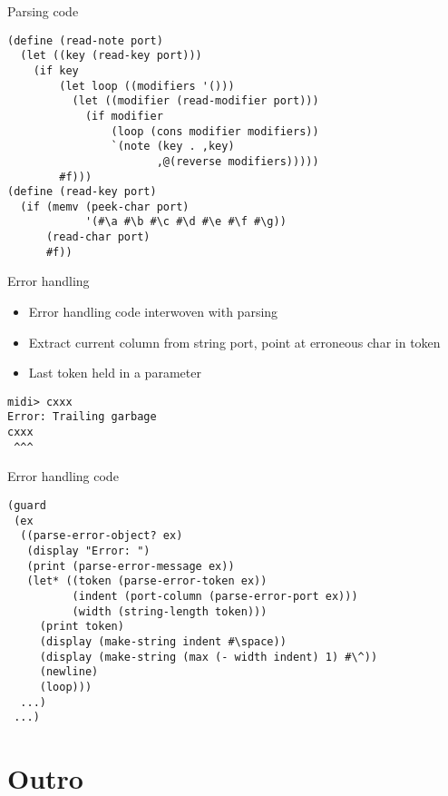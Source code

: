 \documentclass[presentation]{beamer}
\begin{document}
\begin{frame}[fragile,label=sec-3-12]{Parsing code}
 \begin{verbatim}
(define (read-note port)
  (let ((key (read-key port)))
    (if key
        (let loop ((modifiers '()))
          (let ((modifier (read-modifier port)))
            (if modifier
                (loop (cons modifier modifiers))
                `(note (key . ,key)
                       ,@(reverse modifiers)))))
        #f)))
(define (read-key port)
  (if (memv (peek-char port)
            '(#\a #\b #\c #\d #\e #\f #\g))
      (read-char port)
      #f))
\end{verbatim}
\end{frame}

\begin{frame}[fragile,label=sec-3-13]{Error handling}
 \begin{itemize}
\item Error handling code interwoven with parsing
\item Extract current column from string port, point at erroneous char in
token
\item Last token held in a parameter
\end{itemize}

\begin{verbatim}
midi> cxxx
Error: Trailing garbage
cxxx
 ^^^
\end{verbatim}
\end{frame}

\begin{frame}[fragile,label=sec-3-14]{Error handling code}
 \begin{verbatim}
(guard
 (ex
  ((parse-error-object? ex)
   (display "Error: ")
   (print (parse-error-message ex))
   (let* ((token (parse-error-token ex))
          (indent (port-column (parse-error-port ex)))
          (width (string-length token)))
     (print token)
     (display (make-string indent #\space))
     (display (make-string (max (- width indent) 1) #\^))
     (newline)
     (loop)))
  ...)
 ...)
\end{verbatim}
\end{frame}

\section{Outro}
\label{sec-4}
\end{document}
